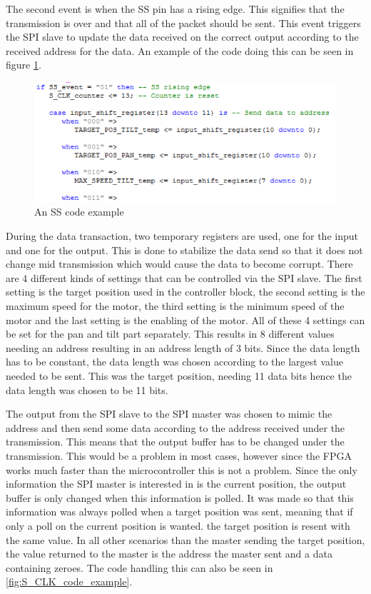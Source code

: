 \newpage

The second event is when the SS pin has a rising edge. This signifies that the transmission is over and that all of the packet should be sent. This event triggers the SPI slave to update the data received on the correct output according to the received address for the data. An example of the code doing this can be seen in figure \ref{fig:SS_code_example}.

\begin{figure}[h!]
\centering
\includegraphics[scale=0.5]{Billeder/FPGA/SPI_Slave/SS_code_example.png}
\caption{ An SS code example }
\label{fig:SS_code_example}
\end{figure}

During the data transaction, two temporary registers are used, one for the input and one for the output. This is done to stabilize the data send so that it does not change mid transmission which would cause the data to become corrupt.
There are 4 different kinds of settings that can be controlled via the SPI slave. The first setting is the target position used in the controller block, the second setting is the maximum speed for the motor, the third setting is the minimum speed of the motor and the last setting is the enabling of the motor. All of these 4  settings can be set for the pan and tilt part separately. This results in 8 different values needing an address resulting in an address length of 3 bits.
Since the data length has to be constant, the data length was chosen according to the largest value needed to be sent. This was the target position, needing 11 data bits hence the data length was chosen to be 11 bits. 

The output from the SPI slave to the SPI master was chosen to mimic the address and then send some data according to the address received under the transmission. This means that the output buffer has to be changed under the transmission. This would be a problem in most cases, however since the FPGA works much faster than the microcontroller this is not a problem. Since the only information the SPI master is interested in is the current position, the output buffer is only changed when this information is polled. It was made so that this information was always polled when a target position was sent, meaning that if only a poll on the current position is wanted. the target position is resent with the same value. In all other scenarios than the master sending the target position, the value returned to the master is the address the master sent and a data containing zeroes. The code handling this can also be seen in \ref{fig:S_CLK_code_example}.

